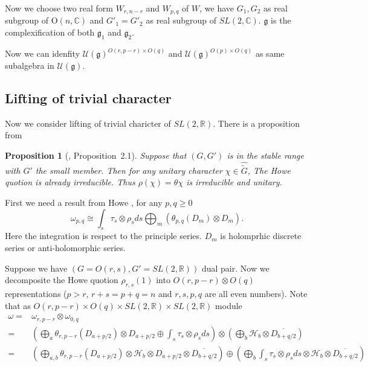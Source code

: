 \documentclass[12pt]{article}
\newtheorem{prop}{Proposition}
\def\bR{{\mathbb{R}}}
\def\bC{{\mathbb{C}}}
\def\fgg{\mathfrak{g}}
\def\chh{\mathcal{H}}
\def\cuu{\mathcal{U}}
\def\OO{\mathrm{O}}
\begin{document}
Now we choose two real form $W_{r,n-r}$ and $W_{p,q}$ of $W$, we have
$G_1, G_2$ as real subgroup of $\OO(n,\bC)$ and $G'_1=G'_2$ as real subgroup 
of $SL(2,\bC)$. $\fgg$ is the complexification of both $\fgg_1$ and $\fgg_2$. 

Now we can idenfity $\cuu(\fgg)^{O(r,p-r)\times O(q)}$ and
$\cuu(\fgg)^{O(p)\times O(q)}$ as same subalgebra in $\cuu(\fgg)$.

\subsection{Lifting of trivial character}
Now we consider lifting of trivial charicter of $SL(2,\bR)$.
There is a proposition from \cite{ZhuHuang1997}
\begin{prop}[\cite{ZhuHuang1997}, Proposition~2.1]
Suppose that $(G,G')$ is in the stable range with $G'$ the small member. 
Then for any unitary character $\chi\in \widehat{\tilde{G}}$, 
The Howe quotion is already irreducible. Thus $\rho(\chi)=\theta{\chi}$
is irreducible and unitary.
\end{prop} 

First we need a result from Howe \cite{Howe1979Opq}, for any $p,q\geq 0$
\[
\omega_{p,q}\cong \int_{s} \tau_s\otimes \rho_s ds \bigoplus_m
\left( \theta_{p,q}(D_m)\otimes D_m\right).
\]
Here the integration is respect to the principle series. $D_m$ is holomprhic 
discrete series or anti-holomorphic series. 

Suppose we have $(G=O(r,s),G'=SL(2,\bR))$ dual pair. 
Now we decomposite the Howe quotion $\rho_{r,s}(1)$ into $O(r,p-r)\otimes O(q)$ representations ($p>r$, $r+s = p+q=n$ and $r,s,p,q$ are all even numbers).
Note that as $O(r,p-r)\times O(q)\times SL(2,\bR)\times SL(2,\bR)$ module
\begin{equation}\label{eq:decomega1}
\begin{split}
\omega =& \omega_{r,p-r}\otimes \omega_{0,q}\\
=& \left(\bigoplus_a \theta_{r,p-r}(D_{a+p/2})\otimes D_{a+p/2} 
\oplus \int_s\tau_s\otimes \rho_s ds \right) \otimes 
\left( \bigoplus_b \chh_b 
\otimes \overline{D_{b+q/2}}\right)\\ 
=& \left(\bigoplus_{a, b} \theta_{r,p-r}(D_{a+p/2})\otimes \chh_b \otimes D_{a+p/2}
\otimes \overline{D_{b+q/2}}\right) 
\oplus\left(\bigoplus_b \int_s\tau_s\otimes \rho_s ds \otimes \chh_b 
\otimes \overline{D_{b+q/2}}\right)
\end{split}
\end{equation}
\end{document}
